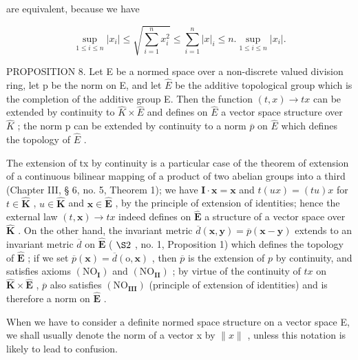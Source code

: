 are equivalent, because we have

\[
\sup _ {1 \leqslant i \leqslant n} | x _ {i} | \leqslant \sqrt {\sum_ {i = 1} ^ {n} x _ {i} ^ {2}} \leqslant \sum_ {i = 1} ^ {n} | x | _ {i} \leqslant n. \sup _ {1 \leqslant i \leqslant n} | x _ {i} |.\tag{2}
\]

PROPOSITION 8. Let E be a normed space over a non-discrete valued division ring, let p be the norm on E, and let \(\hat{E}\) be the additive topological group which is the completion of the additive group E. Then the function \((t, x) \to tx\) can be extended by continuity to \(\hat{K} \times \hat{E}\) and defines on \(\hat{E}\) a vector space structure over \(\hat{K}\) ; the norm p can be extended by continuity to a norm \(\overline{p}\) on \(\hat{E}\) which defines the topology of \(\hat{E}\) .

The extension of tx by continuity is a particular case of the theorem of extension of a continuous bilinear mapping of a product of two abelian groups into a third (Chapter III, § 6, no. 5, Theorem 1); we have \(\mathbf{I} \cdot \mathbf{x} = \mathbf{x}\) and \(t(ux) = (tu)x\) for \(t \in \hat{\mathbf{K}}\) , \(u \in \hat{\mathbf{K}}\) and \(\mathbf{x} \in \hat{\mathbf{E}}\) , by the principle of extension of identities; hence the external law \((t, \mathbf{x}) \to tx\) indeed defines on \(\hat{\mathbf{E}}\) a structure of a vector space over \(\hat{\mathbf{K}}\) . On the other hand, the invariant metric \(\overline{d}(\mathbf{x}, \mathbf{y}) = \overline{p}(\mathbf{x} - \mathbf{y})\) extends to an invariant metric \(\overline{d}\) on \(\hat{\mathbf{E}}\) ( \(\S 2\) , no. 1, Proposition 1) which defines the topology of \(\hat{\mathbf{E}}\) ; if we set \(\overline{p}(\mathbf{x}) = \overline{d}(\mathrm{o}, \mathbf{x})\) , then \(\overline{p}\) is the extension of \(p\) by continuity, and satisfies axioms \((\mathrm{NO}_{\mathbf{I}})\) and \((\mathrm{NO}_{\mathbf{II}})\) ; by virtue of the continuity of \(tx\) on \(\hat{\mathbf{K}} \times \hat{\mathbf{E}}\) , \(\overline{p}\) also satisfies \((\mathrm{NO}_{\mathbf{III}})\) (principle of extension of identities) and is therefore a norm on \(\hat{\mathbf{E}}\) .

When we have to consider a definite normed space structure on a vector space E, we shall usually denote the norm of a vector x by \(\|x\|\) , unless this notation is likely to lead to confusion.

